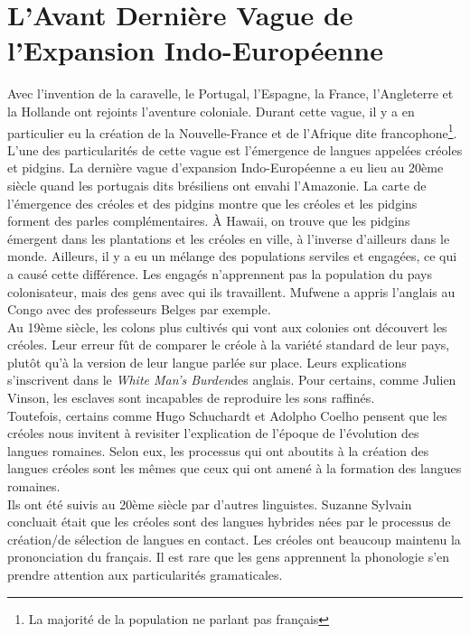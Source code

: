 \documentclass{cours}
\begin{document}
\section{L'Avant Dernière Vague de l'Expansion Indo-Européenne}
Avec l'invention de la caravelle, le Portugal, l'Espagne, la France, l'Angleterre et la Hollande ont rejoints l'aventure coloniale. 
Durant cette vague, il y a en particulier eu la création de la Nouvelle-France et de l'Afrique dite francophone\footnote{La majorité de la population ne parlant pas français}.\\
L'une des particularités de cette vague est l'émergence de langues appelées créoles et pidgins. 
La dernière vague d'expansion Indo-Européenne a eu lieu au 20ème siècle quand les portugais dits brésiliens ont envahi l'Amazonie.
La carte de l'émergence des créoles et des pidgins montre que les créoles et les pidgins forment des parles complémentaires. 
À Hawaii, on trouve que les pidgins émergent dans les plantations et les créoles en ville, à l'inverse d'ailleurs dans le monde. 
Ailleurs, il y a eu un mélange des populations serviles et engagées, ce qui a causé cette différence. Les engagés n'apprennent pas la population du pays colonisateur, mais des gens avec qui ils travaillent.
Mufwene a appris l'anglais au Congo avec des professeurs Belges par exemple.\\
Au 19ème siècle, les colons plus cultivés qui vont aux colonies ont découvert les créoles. Leur erreur fût de comparer le créole à la variété standard de leur pays, plutôt qu'à la version de leur langue parlée sur place.
Leurs explications s'inscrivent dans le \og \textit{White Man's Burden}\fg des anglais. Pour certains, comme Julien Vinson, les esclaves sont incapables de reproduire les sons raffinés.\\
Toutefois, certains comme Hugo Schuchardt et Adolpho Coelho pensent que les créoles nous invitent à revisiter l'explication de l'époque de l'évolution des langues romaines. 
Selon eux, les processus qui ont aboutits à la création des langues créoles sont les mêmes que ceux qui ont amené à la formation des langues romaines.\\
Ils ont été suivis au 20ème siècle par d'autres linguistes. Suzanne Sylvain concluait était que les créoles sont des langues hybrides nées par le processus de création/de sélection de langues en contact.
Les créoles ont beaucoup maintenu la prononciation du français. Il est rare que les gens apprennent la phonologie s'en prendre attention aux particularités gramaticales.\\
\end{document}
